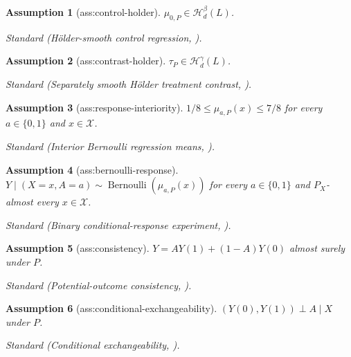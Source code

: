 \documentclass{article}
\newtheorem{assumption}{Assumption}
\begin{document}
\begin{assumption}[ass:control-holder]\label{ass:control-holder}
\(\mu_{0,P}\in\mathcal H_d^{\beta}(L)\).
\par\smallskip\noindent\emph{Standard} (H\"older-smooth control regression, \cite{KennedyBalakrishnanRobinsWasserman2024MinimaxCATE}).
\end{assumption}

\begin{assumption}[ass:contrast-holder]\label{ass:contrast-holder}
\(\tau_P\in\mathcal H_d^{\gamma}(L)\).
\par\smallskip\noindent\emph{Standard} (Separately smooth H\"older treatment contrast, \cite{KennedyBalakrishnanRobinsWasserman2024MinimaxCATE}).
\end{assumption}

\begin{assumption}[ass:response-interiority]\label{ass:response-interiority}
\(1/8\le\mu_{a,P}(x)\le7/8\) for every \(a\in\{0,1\}\) and \(x\in\mathcal X\).
\par\smallskip\noindent\emph{Standard} (Interior Bernoulli regression means, \cite{KennedyBalakrishnanRobinsWasserman2024MinimaxCATE}).
\end{assumption}

\begin{assumption}[ass:bernoulli-response]\label{ass:bernoulli-response}
\(Y\mid(X=x,A=a)\sim\operatorname{Bernoulli}(\mu_{a,P}(x))\) for every \(a\in\{0,1\}\) and \(P_X\)-almost every \(x\in\mathcal X\).
\par\smallskip\noindent\emph{Standard} (Binary conditional-response experiment, \cite{KennedyBalakrishnanRobinsWasserman2024MinimaxCATE}).
\end{assumption}

\begin{assumption}[ass:consistency]\label{ass:consistency}
\(Y=AY(1)+(1-A)Y(0)\) almost surely under \(P\).
\par\smallskip\noindent\emph{Standard} (Potential-outcome consistency, \cite{KennedyBalakrishnanRobinsWasserman2024MinimaxCATE}).
\end{assumption}

\begin{assumption}[ass:conditional-exchangeability]\label{ass:conditional-exchangeability}
\((Y(0),Y(1))\perp A\mid X\) under \(P\).
\par\smallskip\noindent\emph{Standard} (Conditional exchangeability, \cite{KennedyBalakrishnanRobinsWasserman2024MinimaxCATE}).
\end{assumption}
\end{document}
